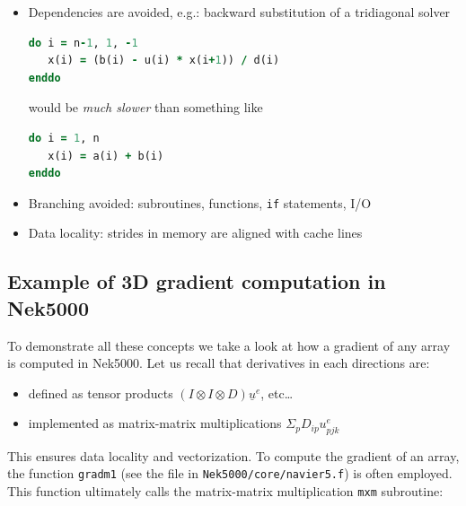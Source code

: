 \documentclass[
  a4paper,
  10pt]{article}
\newcommand{\passthrough}[1]{#1}
\providecommand{\tightlist}{%
  \setlength{\itemsep}{0pt}\setlength{\parskip}{0pt}}
\begin{document}
\begin{itemize}
\item
  Dependencies are avoided, e.g.: backward substitution of a tridiagonal
  solver

\begin{lstlisting}[language=Fortran]
do i = n-1, 1, -1
   x(i) = (b(i) - u(i) * x(i+1)) / d(i)
enddo
\end{lstlisting}

  would be \emph{much slower} than something like

\begin{lstlisting}[language=Fortran]
do i = 1, n
   x(i) = a(i) + b(i)
enddo
\end{lstlisting}
\item
  Branching avoided: subroutines, functions,
  \passthrough{\lstinline!if!} statements, I/O
\item
  Data locality: strides in memory are aligned with cache lines
\end{itemize}

\hypertarget{example-of-3d-gradient-computation-in-nek5000}{%
\subsection{Example of 3D gradient computation in
Nek5000}\label{example-of-3d-gradient-computation-in-nek5000}}

To demonstrate all these concepts we take a look at how a gradient of
any array is computed in Nek5000. Let us recall that derivatives in each
directions are:

\begin{itemize}
\tightlist
\item
  defined as tensor products \((I \otimes I \otimes D) \underline u^e\),
  etc\ldots{}
\item
  implemented as matrix-matrix multiplications
  \(\Sigma_p D_{ip}u^e_{pjk}\)
\end{itemize}

This ensures data locality and vectorization. To compute the gradient of
an array, the function \passthrough{\lstinline!gradm1!} (see the file in
\passthrough{\lstinline!Nek5000/core/navier5.f!}) is often employed.
This function ultimately calls the matrix-matrix multiplication
\passthrough{\lstinline!mxm!} subroutine:
\end{document}
